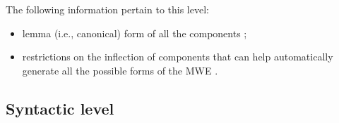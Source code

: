 \documentclass[output=paper,colorlinks,citecolor=brown]{langscibook}
\begin{document}
The following information pertain to this level:
        \begin{itemize}
            \item lemma (i.e., canonical) form of all the components \citep{dyvik2019,gregoire-2007,%
            Odijk2013,chapters/07,chapters/04,chapters/01};%

            \item restrictions on the inflection of components that can help automatically generate all the possible forms of the MWE \citep{gregoire-2007,al-hajetal2013,markantonatou-etal-2019-idion,markantonatou-etal-in-prep,chapters/02,chapters/04,chapters/01}.
            
        \end{itemize}
        
\subsection{Syntactic level}
\end{document}
